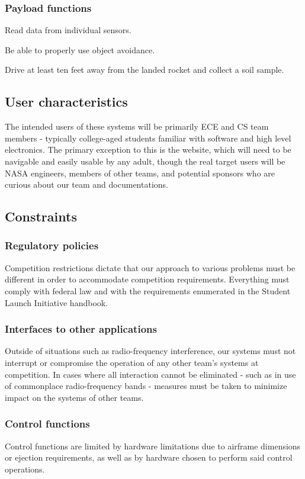 \documentclass[onecolumn, draftclsnofoot, 10pt, compsoc]{IEEEtran}
\begin{document}
\subsubsection{Payload functions}
Read data from individual sensors.

Be able to properly use object avoidance. 

Drive at least ten feet away from the landed rocket and collect a soil sample. 

\subsection{User characteristics}
The intended users of these systems will be primarily ECE and CS team members - typically college-aged students familiar with software and high level electronics. The primary exception to this is the website, which will need to be navigable and easily usable by any adult, though the real target users will be NASA engineers, members of other teams, and potential sponsors who are curious about our team and documentations.

\subsection{Constraints}
\subsubsection{Regulatory policies}
Competition restrictions dictate that our approach to various problems must be different in order to accommodate competition requirements. Everything must comply with federal law and with the requirements enumerated in the Student Launch Initiative handbook.

\subsubsection{Interfaces to other applications}
Outside of situations such as radio-frequency interference, our systems must not interrupt or compromise the operation of any other team's systems at competition. In cases where all interaction cannot be eliminated - such as in use of commonplace radio-frequency bands - measures must be taken to minimize impact on the systems of other teams.

\subsubsection{Control functions}
Control functions are limited by hardware limitations due to airframe dimensions or ejection requirements, as well as by hardware chosen to perform said control operations.
\end{document}
